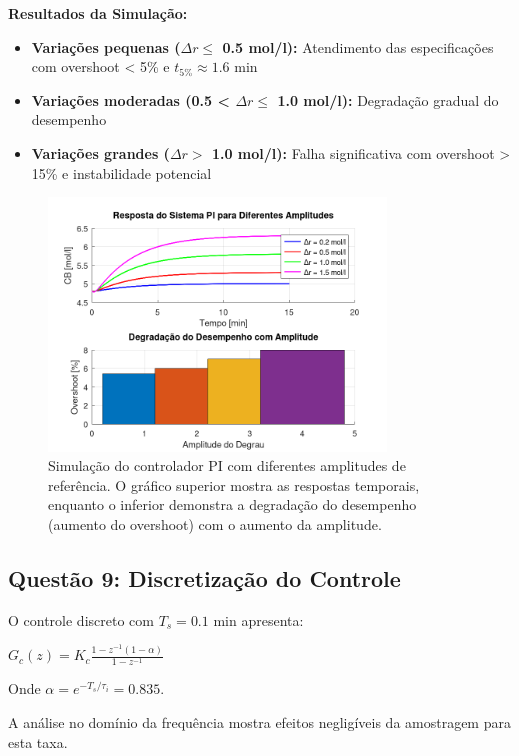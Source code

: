 \documentclass[a4paper,12pt]{article}
\begin{document}
\textbf{Resultados da Simulação:}
\begin{itemize}
\item \textbf{Variações pequenas ($ \Delta r \leq$ 0.5 mol/l):} Atendimento das especificações com overshoot < 5\% e $t_{5\%} \approx 1.6$ min
\item \textbf{Variações moderadas (0.5 < $ \Delta r \leq$ 1.0 mol/l):} Degradação gradual do desempenho
\item \textbf{Variações grandes ($ \Delta r >$ 1.0 mol/l):} Falha significativa com overshoot > 15\% e instabilidade potencial
\end{itemize}

\begin{figure}[H]
    \centering
    \includegraphics[width=0.8\textwidth]{figura_questao8_pi_amplitudes.png}
    \caption{Simulação do controlador PI com diferentes amplitudes de referência. O gráfico superior mostra as respostas temporais, enquanto o inferior demonstra a degradação do desempenho (aumento do overshoot) com o aumento da amplitude.}
    \label{fig:pi_amplitudes}
\end{figure}

\subsection{Questão 9: Discretização do Controle}

O controle discreto com $T_s = 0.1$ min apresenta:

$G_c(z) = K_c \frac{1 - z^{-1}(1-\alpha)}{1 - z^{-1}}$

Onde $\alpha = e^{-T_s/\tau_i} = 0.835$.

A análise no domínio da frequência mostra efeitos negligíveis da amostragem para esta taxa.
\end{document}
